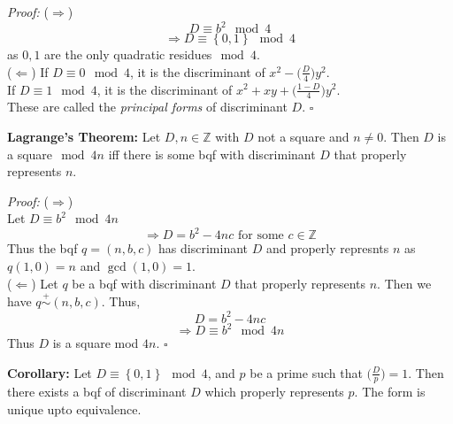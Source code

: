 \documentclass[a4paper,11pt,abstracton]{scrartcl}
\theoremstyle{dotlessP}
\theoremstyle{dotlessS}
\theoremstyle{remark}
\theoremstyle{definition}
\begin{document}
\begin{claim_box}
\textit{Proof:} ($\Rightarrow$)
\[
D \equiv b^2\mod{4}
\]
\[
\Rightarrow D \equiv \left\{0,1\right\}\mod{4}
\]
as $0,1$ are the only quadratic residues$\mod{4}$.
\\ ($\Leftarrow$)
If $D \equiv 0 \mod{4}$, it is the discriminant of $x^2-\bigg( \frac{D}{4} \bigg)y^2$.
\\If $D \equiv 1 \mod{4}$, it is the discriminant of $x^2+xy+\bigg( \frac{1-D}{4} \bigg)y^2$.
\\These are called the \emph{principal forms} of discriminant $D$.
\hfill$\square$
\end{claim_box}

\begin{problem_box}
\textbf{Lagrange's Theorem:} Let $D, n \in \mathbb{Z}$ with $D$ not a square and $n \neq 0$. Then $D$ is a square$\mod{4n}$ iff there is some bqf with discriminant $D$ that properly represents $n$.
\end{problem_box}

\begin{claim_box}
\textit{Proof:} ($\Rightarrow$)
\\ Let $D \equiv b^2 \mod{4n}$
$$\Rightarrow D = b^2-4nc \text{ for some } c\in \mathbb{Z}$$
Thus the bqf $q=(n,b,c)$ has discriminant $D$ and properly represnts $n$ as $q(1,0)=n$ and $\gcd(1,0)=1$.
\\ ($\Leftarrow$)
Let $q$ be a bqf with discriminant $D$ that properly represents $n$. Then we have $q \overset{+}{\sim} (n,b,c)$. Thus,
$$D=b^2-4nc$$
$$\Rightarrow D \equiv b^2 \mod{4n}$$
Thus $D$ is a square mod $4n$.
\hfill $\square$
\end{claim_box}

\textbf{Corollary:} Let $D \equiv \left\{0,1\right\} \mod{4}$, and $p$ be a prime such that $\bigg(\frac{D}{p}\bigg)=1$. Then there exists a bqf of discriminant $D$ which properly represents $p$. The form is unique upto equivalence.
\end{document}
